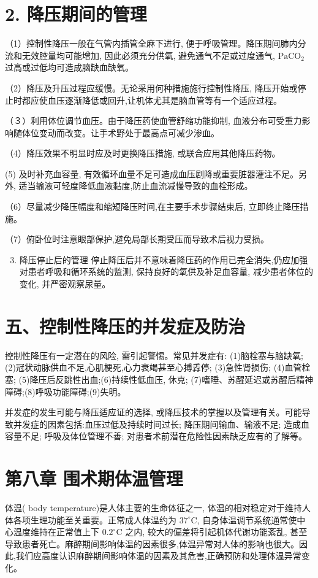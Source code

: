 \documentclass[10pt]{article}
\begin{document}
\section*{2. 降压期间的管理}
（1）控制性降压一般在气管内插管全麻下进行, 便于呼吸管理。降压期间肺内分流和无效腔量均可能增加, 因此必须充分供氧, 避免通气不足或过度通气, $\mathrm{PaCO}_{2}$ 过高或过低均可造成脑缺血缺氧。

（2）降压及升压过程应缓慢。无论采用何种措施施行控制性降压, 降压开始或停止时都应使血压逐渐降低或回升,让机体尤其是脑血管等有一个适应过程。

（３）利用体位调节血压。由于降压药使血管舒缩功能抑制, 血液分布可受重力影响随体位变动而改变。让手术野处于最高点可减少渗血。

（4）降压效果不明显时应及时更换降压措施, 或联合应用其他降压药物。

(5) 及时补充血容量, 有效循环血量不足可造成血压剧降或重要脏器灌注不足。另外, 适当输液可轻度降低血液黏度,防止血流减慢导致的血栓形成。

（6）尽量减少降压幅度和缩短降压时间,在主要手术步骤结束后, 立即终止降压措施。

（7）俯卧位时注意眼部保护,避免局部长期受压而导致术后视力受损。

\begin{enumerate}
  \setcounter{enumi}{2}
  \item 降压停止后的管理 停止降压后并不意味着降压药的作用已完全消失,仍应加强对患者呼吸和循环系统的监测, 保持良好的氧供及补足血容量, 减少患者体位的变化, 并严密观察尿量。
\end{enumerate}

\section*{五、控制性降压的并发症及防治}
控制性降压有一定潜在的风险, 需引起警惕。常见并发症有: (1)脑栓塞与脑缺氧; (2)冠状动脉供血不足,心肌梗死,心力衰竭甚至心搏掱停; (3)急性肾损伤; (4)血管栓塞; (5)降压后反跳性出血;(6)持续性低血压, 休克; (7)嗜睡、苏醒延迟或苏醒后精神障碍;(8)呼吸功能障碍;(9)失明。

并发症的发生可能与降压适应证的选择, 或降压技术的掌握以及管理有关。可能导致并发症的因素包括:血压过低及持续时间过长; 降压期间输血、输液不足; 造成血容量不足; 呼吸及体位管理不善; 对患者术前潜在危险性因素缺乏应有的了解等。

\section*{第八章 围术期体温管理}
体温( body temperature)是人体主要的生命体征之一, 体温的相对稳定对于维持人体各项生理功能至关重要。正常成人体温约为 $37^{\circ} \mathrm{C}$, 自身体温调节系统通常使中心温度维持在正常值上下 $0.2^{\circ} \mathrm{C}$ 之内, 较大的偏差将引起机体代谢功能紊乱, 甚至导致患者死亡。麻醉期间影响体温的因素很多,体温异常对人体的影响也很大。因此,我们应高度认识麻醉期间影响体温的因素及其危害,正确预防和处理体温异常变化。
\end{document}
